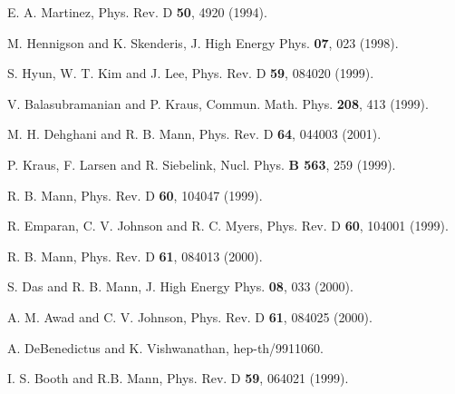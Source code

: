 \documentclass[a4paper,12pt,onecolumn]{revtex4}
\begin{document}
\begin{thebibliography}{99}
  E. A. Martinez, Phys. Rev. D \textbf{50}, 4920 (1994).

  M. Hennigson and K. Skenderis, J. High Energy Phys. \textbf{07}, 023
(1998).

  S. Hyun, W. T. Kim and J. Lee, Phys. Rev. D \textbf{59},
084020 (1999).

  V. Balasubramanian and P. Kraus, Commun. Math. Phys.
\textbf{208}, 413 (1999).

  M. H. Dehghani and R. B. Mann, Phys. Rev. D \textbf{64},
044003 (2001).

  P. Kraus, F. Larsen and R. Siebelink, Nucl. Phys. \textbf{B
563}, 259 (1999).

  R. B. Mann, Phys. Rev. D \textbf{60}, 104047 (1999).

  R. Emparan, C. V. Johnson and R. C. Myers, Phys.
Rev. D \textbf{60}, 104001 (1999).

  R. B. Mann, Phys. Rev. D \textbf{61}, 084013 (2000).

  S. Das and R. B. Mann, J. High Energy Phys. \textbf{08}, 033 (2000).

  A. M. Awad and C. V. Johnson, Phys. Rev. D \textbf{61}, 084025
(2000).

  A. DeBenedictus and K. Vishwanathan, hep-th/9911060.

  I. S. Booth and R.B. Mann, Phys. Rev. D \textbf{59}, 064021
(1999).
\end{thebibliography}
\end{document}
